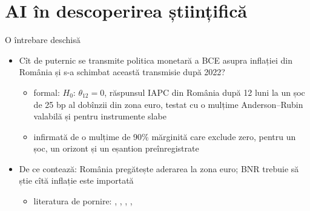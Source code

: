\section{AI în descoperirea științifică}

\begin{frame}{O întrebare deschisă}
\itemsize{\small}
\begin{itemize}
    \item Cît de puternic se transmite politica monetară a BCE asupra inflației din România și s-a schimbat această transmisie după 2022?
    \begin{itemize}
        \item formal: $H_0$: $\theta_{12} = 0$, răspunsul IAPC din România după 12 luni la un șoc de 25 bp al dobînzii din zona euro, testat cu o mulțime Anderson--Rubin valabilă și pentru instrumente slabe
        \item infirmată de o mulțime de 90\% mărginită care exclude zero, pentru un șoc, un orizont și un eșantion preînregistrate
    \end{itemize}
    \item De ce contează: România pregătește aderarea la zona euro; BNR trebuie să știe cîtă inflație este importată
    \begin{itemize}
        \item literatura de pornire: , , , , 
    \end{itemize}
\end{itemize}
\end{frame}

